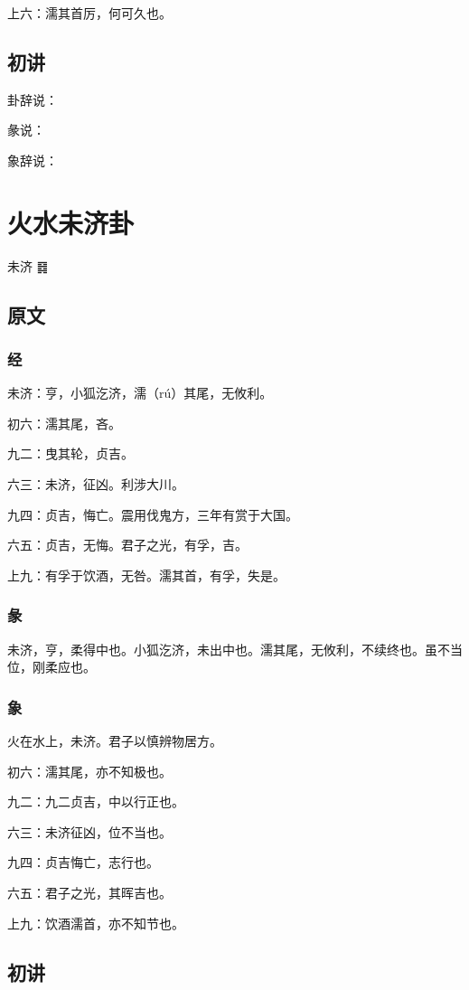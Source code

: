 \documentclass[12pt,oneside]{book}
\begin{document}
上六：濡其首厉，何可久也。

\section{初讲}
卦辞说：

彖说：

象辞说：

\chapter{火水未济卦}
未济 {\Large ䷿}
\section{原文}

\subsection{经}
未济：亨，小狐汔济，濡（rú）其尾，无攸利。

初六：濡其尾，吝。

九二：曳其轮，贞吉。

六三：未济，征凶。利涉大川。

九四：贞吉，悔亡。震用伐鬼方，三年有赏于大国。

六五：贞吉，无悔。君子之光，有孚，吉。

上九：有孚于饮酒，无咎。濡其首，有孚，失是。

\subsection{彖}
未济，亨，柔得中也。小狐汔济，未出中也。濡其尾，无攸利，不续终也。虽不当位，刚柔应也。

\subsection{象}
火在水上，未济。君子以慎辨物居方。

初六：濡其尾，亦不知极也。

九二：九二贞吉，中以行正也。

六三：未济征凶，位不当也。

九四：贞吉悔亡，志行也。

六五：君子之光，其晖吉也。

上九：饮酒濡首，亦不知节也。

\section{初讲}
\end{document}
